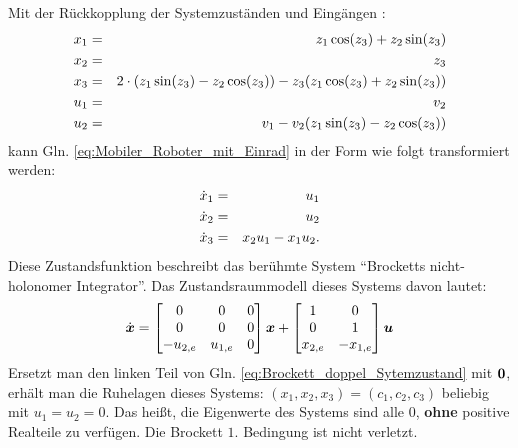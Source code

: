 \begin{beispiel}
	Mit der Rückkopplung der Systemzuständen und Eingängen \cite{liberzon2012switching}: 
	\begin{eqnarray}
	x_{1} &=& z_{1}\cos(z_{3}) + z_{2}\sin(z_{3})\notag\\
	x_{2} &=& z_{3}\notag\\
	x_{3} &=& 2\cdot(z_{1}\sin(z_{3})-z_{2}\cos(z_{3})) - z_{3}(z_{1}\cos(z_{3})+z_{2}\sin(z_{3}))\notag\\
	u_{1} &=& v_{2}\notag\\
	u_{2} &=& v_{1} - v_{2}(z_{1}\sin(z_{3})-z_{2}\cos(z_{3}))
	\label{eq:Mobiler_Roboter_mit_Einrad_Brockett_Doppelintegrator_Transformation}
	\end{eqnarray}
	kann Gln. \eqref{eq:Mobiler_Roboter_mit_Einrad} in der Form wie folgt transformiert werden:   
	\begin{eqnarray}
	\dot{x}_{1} &=& u_{1}\notag\\
	\dot{x}_{2} &=& u_{2}\notag\\
	\dot{x}_{3} &=& x_{2}u_{1}-x_{1}u_{2}.
	\label{eq:Brockett_Doppelintegrator}
	\end{eqnarray}
	Diese Zustandsfunktion beschreibt das berühmte System ``Brocketts nicht-holonomer Integrator''. 
  	Das Zustandsraummodell dieses Systems davon lautet:
	  \begin{eqnarray}
	  \dot{\boldsymbol x} = \begin{bmatrix}
	  0 & 0 & 0\\ 
	  0 & 0 & 0\\
	  -u_{2,e} & u_{1,e} & 0
	  \end{bmatrix}\boldsymbol x + \begin{bmatrix}
	  1 & 0\\
	  0 & 1\\
	  x_{2,e} & -x_{1,e} 
	  \end{bmatrix}\boldsymbol u
	  \label{eq:Brockett_doppel_Sytemzustand}
	  \end{eqnarray}
  	Ersetzt man den linken Teil von Gln. \eqref{eq:Brockett_doppel_Sytemzustand} mit $\boldsymbol 0$, erhält man die Ruhelagen dieses Systems: $(x_{1},x_{2},x_{3})=(c_{1},c_{2},c_{3})$ beliebig mit $u_{1}=u_{2}=0$. Das heißt, die Eigenwerte des Systems sind alle $0$, \textbf{ohne} positive Realteile zu verfügen. Die Brockett $1.$ Bedingung ist nicht verletzt.
   

\end{beispiel}

